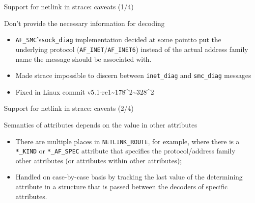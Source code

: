 \documentclass[unicode,aspectratio=169]{beamer}
\begin{document}
\begin{frame}[fragile]{Support for netlink in strace: caveats \hfill (1/4)}
\begin{block}{Don't provide the necessary information for decoding}
\begin{itemize}
  \item \texttt{AF\_SMC}'s\footnotemark[1] \texttt{sock\_diag} implementation
        decided at some point\footnotemark[2] to put the underlying
	protocol (\texttt{AF\_INET}/\texttt{AF\_INET6}) instead of the actual
	address family name the message should be associated with.
  \item Made strace impossible to discern between \texttt{inet\_diag}
        and \texttt{smc\_diag} messages
  \item Fixed in Linux commit v5.1-rc1\~{}178\^{}2\~{}328\^{}2
\end{itemize}
\end{block}
\end{frame}

\begin{frame}[fragile]{Support for netlink in strace: caveats \hfill (2/4)}
\begin{block}{Semantics of attributes depends on the value in other attributes}
\begin{itemize}
  \item There are multiple places in \texttt{NETLINK\_ROUTE}, for example,
        where there is a \texttt{*\_KIND} or \texttt{*\_AF\_SPEC} attribute that
        specifies the protocol/address family other attributes (or attributes
	within other attributes);
  \item Handled on case-by-case basis by tracking the last value
        of the determining attribute in a structure that is passed between
	the decoders of specific attributes.
\end{itemize}
\end{block}
\end{frame}
\end{document}
